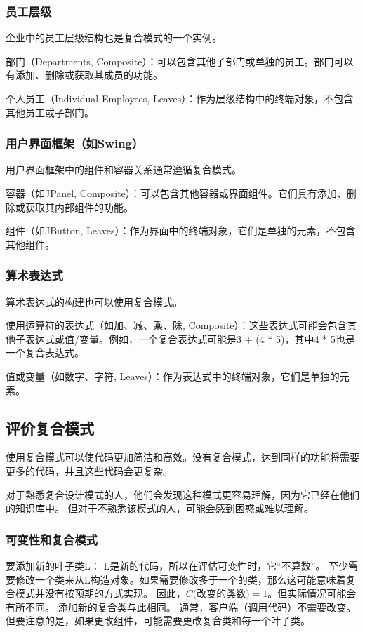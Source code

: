 \subsubsection{员工层级}
企业中的员工层级结构也是复合模式的一个实例。

部门（Departments, Composite）：可以包含其他子部门或单独的员工。部门可以有添加、删除或获取其成员的功能。

个人员工（Individual Employees, Leaves）：作为层级结构中的终端对象，不包含其他员工或子部门。

\subsubsection{用户界面框架（如Swing）}

用户界面框架中的组件和容器关系通常遵循复合模式。

容器（如JPanel, Composite）：可以包含其他容器或界面组件。它们具有添加、删除或获取其内部组件的功能。

组件（如JButton, Leaves）：作为界面中的终端对象，它们是单独的元素，不包含其他组件。

\subsubsection{算术表达式}

算术表达式的构建也可以使用复合模式。

使用运算符的表达式（如加、减、乘、除, Composite）：这些表达式可能会包含其他子表达式或值/变量。例如，一个复合表达式可能是3 + (4 * 5)，其中4 * 5也是一个复合表达式。

值或变量（如数字、字符, Leaves）：作为表达式中的终端对象，它们是单独的元素。

\subsection{评价复合模式}

使用复合模式可以使代码更加简洁和高效。没有复合模式，达到同样的功能将需要更多的代码，并且这些代码会更复杂。

对于熟悉复合设计模式的人，他们会发现这种模式更容易理解，因为它已经在他们的知识库中。
但对于不熟悉该模式的人，可能会感到困惑或难以理解。

\subsubsection{可变性和复合模式}
要添加新的叶子类L：
L是新的代码，所以在评估可变性时，它“不算数”。
至少需要修改一个类来从L构造对象。如果需要修改多于一个的类，那么这可能意味着复合模式并没有按预期的方式实现。
因此，$C\text{(改变的类数)}= 1$。但实际情况可能会有所不同。
添加新的复合类与此相同。
通常，客户端（调用代码）不需要改变。
但要注意的是，如果更改组件，可能需要更改复合类和每一个叶子类。

